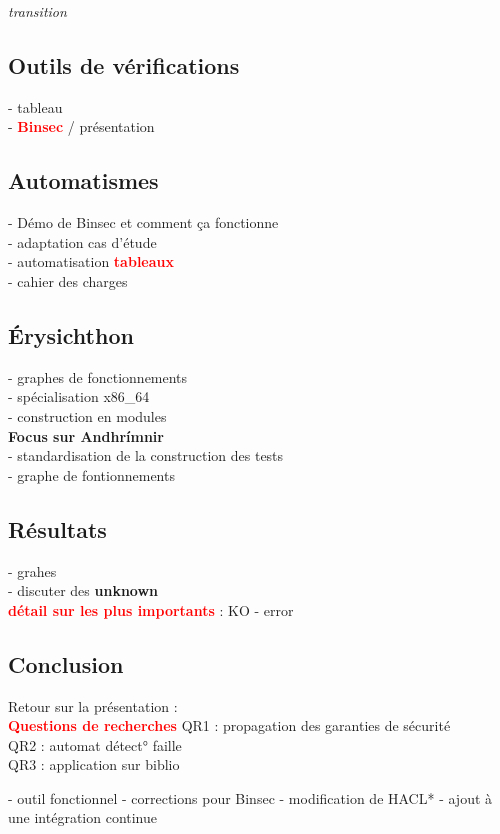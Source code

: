 \documentclass[10pt,a5paper]{article}
\newcommand{\important}[1]{\textbf{\textcolor{red}{#1}}}
\begin{document}
\textit{transition}

\subsection*{Outils de vérifications}
- tableau \\
- \important{Binsec} / présentation
\newpage
\subsection*{Automatismes}
\begin{multicols}{2}
  - Démo de Binsec et comment ça fonctionne\\
  - adaptation cas d'étude\\
  - automatisation \important{tableaux}\\
  - cahier des charges
\end{multicols}

\subsection*{Érysichthon}
- graphes de fonctionnements\\
- spécialisation x86\_64\\
- construction en modules\\
\textbf{Focus sur Andhrímnir}\\
- standardisation de la construction des tests\\
- graphe de fontionnements\\

\subsection*{Résultats}
- grahes\\
- discuter des \textbf{unknown}\\
\important{détail sur les plus importants} : KO - error


\subsection*{Conclusion}

Retour sur la présentation : \\
\important{Questions de recherches}
QR1 : propagation des garanties de sécurité \\
QR2 : automat détect° faille\\
QR3 : application sur biblio
\begin{multicols}{2}
- outil fonctionnel
- corrections pour Binsec
- modification de HACL*
- ajout à une intégration continue  
\end{multicols}
\end{document}
